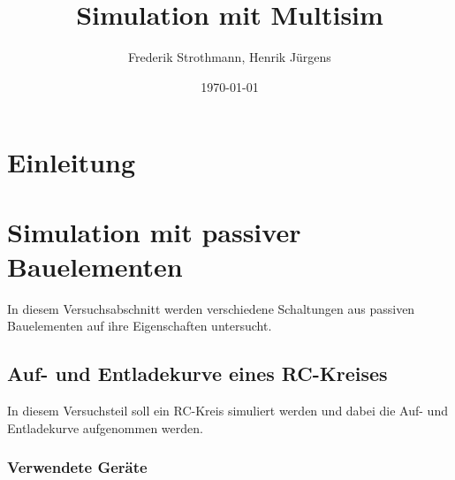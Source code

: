 \documentclass[12pt,a4paper]{article}
\title{Simulation mit Multisim}
\author{Frederik Strothmann, Henrik Jürgens}
\date{\today}
\begin{document}
\maketitle
\newpage
\tableofcontents
\newpage
\section{Einleitung}

\section{Simulation mit passiver Bauelementen}

In diesem Versuchsabschnitt werden verschiedene Schaltungen aus passiven Bauelementen auf ihre Eigenschaften untersucht.

\subsection{Auf- und Entladekurve eines RC-Kreises}

In diesem Versuchsteil soll ein RC-Kreis simuliert werden und dabei die Auf- und Entladekurve aufgenommen werden.

\subsubsection{Verwendete Geräte}
\end{document}
